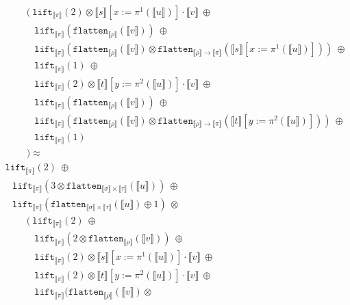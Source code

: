 \documentclass[a4paper,UKenglish,cleveref,autoref,numberwithinsect]{lipics-v2019}
\theoremstyle{definition}
\newcommand{\arrtype}{\rightarrow}
\newcommand{\flatten}{\mathtt{flatten}}
\newcommand{\lift}{\mathtt{lift}}
\newcommand{\typeinterpret}[1]{\llbracket #1 \rrbracket}
\newcommand{\interpret}[1]{\llbracket #1 \rrbracket}
\begin{document}
\begin{itemize}
\[\begin{array}{l}
  \phantom{ABC}
  (\ \lift_{\typeinterpret{\pi}}(2) \otimes \interpret{s}[x:=\pi^1(
    \interpret{u})] \cdot \interpret{v}\ \oplus \\
  \phantom{ABCD}
  \lift_{\typeinterpret{\pi}}(\flatten_{
    \typeinterpret{\rho}}(\interpret{v}))\ \oplus \\
  \phantom{ABCD}
  \lift_{\typeinterpret{\pi}}(
    \flatten_{\typeinterpret{\rho}}(\interpret{v}) \otimes
    \flatten_{\typeinterpret{\rho} \arrtype \typeinterpret{\pi}}(
    \interpret{s}[x:=\pi^1(\interpret{u})]))\ \oplus \\
  \phantom{ABCD}
  \lift_{\typeinterpret{\pi}}(1)\ \oplus \\
  \phantom{ABCD}
  \lift_{\typeinterpret{\pi}}(2) \otimes \interpret{t}[y:=\pi^2(
    \interpret{u})] \cdot \interpret{v}\ \oplus \\
  \phantom{ABCD}
  \lift_{\typeinterpret{\pi}}(
    \flatten_{\typeinterpret{\rho}}(\interpret{v}))\ \oplus \\
  \phantom{ABCD}
  \lift_{\typeinterpret{\pi}}(
    \flatten_{\typeinterpret{\rho}}(\interpret{v}) \otimes
    \flatten_{\typeinterpret{\rho} \arrtype
    \typeinterpret{\pi}}(\interpret{t}[y:=\pi^2(\interpret{u})]))\ 
    \oplus\\
  \phantom{ABCD}
  \lift_{\typeinterpret{\pi}}(1) \\
  \phantom{ABC}) \approx \\
  \lift_{\typeinterpret{\pi}}(2)\ \oplus \\
  \phantom{A}
  \lift_{\typeinterpret{\pi}}(3 \otimes \flatten_{\typeinterpret{\sigma}
    \times \typeinterpret{\tau}}(\interpret{u}))\ \oplus \\
  \phantom{A}
  \lift_{\typeinterpret{\pi}}(\flatten_{\typeinterpret{\sigma} \times
    \typeinterpret{\tau}}(\interpret{u}) \oplus 1)\ \otimes \\
  \phantom{ABC}
  (\ \lift_{\typeinterpret{\pi}}(2)\ \oplus \\
  \phantom{ABCD}
  \lift_{\typeinterpret{\pi}}(2 \otimes \flatten_{
    \typeinterpret{\rho}}(\interpret{v}))\ \oplus \\
  \phantom{ABCD}
  \lift_{\typeinterpret{\pi}}(2) \otimes \interpret{s}[x:=\pi^1(
    \interpret{u})] \cdot \interpret{v}\ \oplus \\
  \phantom{ABCD}
  \lift_{\typeinterpret{\pi}}(2) \otimes \interpret{t}[y:=\pi^2(
    \interpret{u})] \cdot \interpret{v}\ \oplus \\
  \phantom{ABCD}
  \lift_{\typeinterpret{\pi}}(
    \flatten_{\typeinterpret{\rho}}(\interpret{v}) \otimes

\end{array}\]
\end{itemize}
\end{document}
